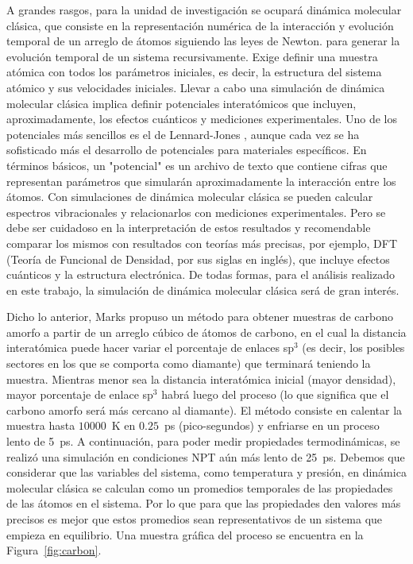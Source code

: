 \documentclass[aps,prl,twocolumn,superscriptaddress,groupedaddress]{revtex4}
\begin{document}
A grandes rasgos, para la unidad de investigación se ocupará dinámica molecular clásica, que consiste en la representación numérica de la interacción y evolución temporal de un arreglo de átomos siguiendo las leyes de Newton.  para generar la evolución temporal de un sistema recursivamente. Exige definir una muestra atómica con todos los parámetros iniciales, es decir, la estructura del sistema atómico y sus velocidades iniciales. Llevar a cabo una simulación de dinámica molecular clásica implica definir potenciales interatómicos que incluyen, aproximadamente, los efectos cuánticos y mediciones experimentales. Uno de los  potenciales más sencillos es el de Lennard-Jones \cite{LJ}, aunque cada vez se ha sofisticado más el desarrollo de potenciales para materiales específicos. En términos básicos, un "potencial" es un archivo de texto que contiene cifras que representan parámetros que simularán aproximadamente la interacción entre los átomos. \cite{MDErcolessi} Con simulaciones de dinámica molecular clásica se pueden calcular espectros vibracionales y relacionarlos con mediciones experimentales. Pero se debe ser cuidadoso en la interpretación de estos resultados y recomendable comparar los mismos con resultados con teorías más precisas, por ejemplo, DFT (Teoría de Funcional de Densidad, por sus siglas en inglés), que incluye efectos cuánticos y la estructura electrónica. De todas formas, para el análisis realizado en este trabajo, la simulación de dinámica molecular clásica será de gran interés.

Dicho lo anterior, Marks\cite{ACPot1} propuso un método para obtener muestras de carbono amorfo a partir de un arreglo cúbico de átomos de carbono, en el  cual la distancia interatómica puede hacer variar el porcentaje de enlaces sp$^3$ (es decir, los posibles sectores en los que se comporta como diamante) que terminará teniendo la muestra. Mientras menor sea la distancia interatómica inicial (mayor densidad), mayor porcentaje de enlace sp$^3$ habrá luego del proceso (lo que significa que el carbono amorfo será más cercano al diamante). El método consiste en  calentar la muestra hasta $10000$~K en $0.25$~ps (pico-segundos) y enfriarse en un proceso lento de 5~ps. A continuación, para poder medir propiedades termodinámicas, se realizó una simulación en condiciones NPT aún más lento de 25~ps. Debemos que considerar que las variables del sistema, como temperatura y presión, en dinámica molecular clásica se calculan como un promedios temporales de las  propiedades de las átomos en el sistema. Por lo que para que las propiedades den valores más precisos es mejor que estos promedios sean representativos de un sistema que empieza en equilibrio. Una muestra gráfica del proceso se encuentra en la Figura~\ref{fig:carbon}.
\end{document}
